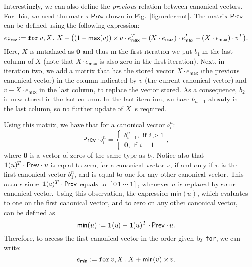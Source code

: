 Interestingly, we can also define the \textit{previous} relation between canonical vectors. For this, we need
the matrix $\mathsf{Prev}$ shown in Fig.~\ref{fig:ordermat}.
%
The matrix 
$\mathsf{Prev}$ can be defined using the following \langfor expression:
$$e_{\mathsf{Prev}}:= \texttt{for}\, v,X \texttt{.}\, X + \bigl((1 - \mathsf{max}(v))\times v\cdot e_{\mathsf{max}}^T - (X\cdot e_{\mathsf{max}})\cdot e_{\mathsf{max}}^T + (X\cdot e_{\mathsf{max}})\cdot v^T\bigr).$$
Here, $X$ is initialized as $\mathbf{0}$ and thus in the first iteration we put
 $b_1$ in the last column of $X$ (note that $X\cdot e_{\mathsf{max}}$ is also zero in the first iteration). Next, in iteration two, we add a matrix that has the stored vector $X\cdot e_{\mathsf{max}}$ (the previous canonical vector) in the column indicated by $v$ (the current canonical vector) and $v-X\cdot e_{\mathsf{max}}$ in the last column, to replace the vector stored. As a consequence, $b_2$ is now stored in the last column. In the last iteration, we have $b_{n-1}$ already in the last column, so no further update of $X$ is required.

Using this matrix, we have that for a canonical vector $b_i^n$:
\[
\mathsf{Prev}\cdot b_i^n=\begin{cases}
               b_{i-1}^n, \text{ if } i > 1 \\
              \mathbf{0}, \text{ if } i = 1
            \end{cases},
\]
where $\mathbf{0}$ is a vector of zeros of the same type as $b_i$. Notice also that $\mathbf{1}(u)^T\cdot \mathsf{Prev} \cdot u$ is equal to zero, for a canonical vector $u$, if and only if $u$ is the first canonical vector $b_1^n$, and is equal to one for any other canonical vector. This occurs since $\mathbf{1}(u)^T\cdot \mathsf{Prev}$ equals to $[0\ 1\ \cdots\ 1]$, whenever $u$ is replaced by some canonical vector. Using this observation, the expression $\mathsf{min}(u)$, which evaluates to one on the first canonical vector, and to zero on any other canonical vector, can be  defined as $$\mathsf{min}(u) := \mathbf{1}(u) - \mathbf{1}(u)^T\cdot \mathsf{Prev} \cdot u.$$%
Therefore, to access the first canonical vector in the order given by \texttt{for}, we can write:
$$e_{\mathsf{min}} := \texttt{for}\, v,X \texttt{.}\, X + \mathsf{min}(v)\times v.$$


